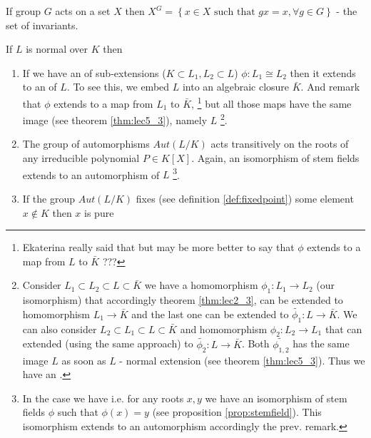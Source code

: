 \begin{definition}
  If group $G$ acts on a set $X$ then $X^G = \left\{x
  \in X \mbox{ such that } gx = x, \forall g \in G\right\}$ - the
  set of invariants.
  \label{def:setinvariants}
\end{definition}

\begin{remark}
  If $L$ is normal over $K$ then
  \begin{enumerate}
  \item If we have an  of sub-extensions
    ($K \subset L_1, L_2 \subset L$)
    $\phi: L_1 \cong L_2$ then it extends to an
     of $L$.  To see this, we embed $L$ into
    an algebraic closure $\bar{K}$. And remark that $\phi$ extends to a
    map from $L_1$ to $\bar{K}$,
    \footnote{
      Ekaterina really said that but may be more better to say that
      $\phi$ extends to a map from $L$ to $\bar{K}$ ???
    }
    but all those maps have the same
    image (see theorem \ref{thm:lec5_3}), namely $L$
    \footnote{
      Consider $L_1 \subset L_2 \subset L \subset \bar{K}$ we have a
      homomorphism $\phi_1: L_1 \to L_2$ (our isomorphism) that
      accordingly theorem \ref{thm:lec2_3}, can be extended to
      homomorphism $L_1 \to \bar{K}$ and the last one can be extended
      to $\tilde{\phi_1}: L \to \bar{K}$. We can also consider
      $L_2 \subset L_1 \subset L \subset \bar{K}$ and homomorphism
      $\phi_2: L_2 \to L_1$ that can extended (using the same
      approach) to  $\tilde{\phi_2}: L \to \bar{K}$. Both
      $\tilde{\phi_{1,2}}$ has the same image $L$ as soon as $L$ -
      normal extension (see theorem \ref{thm:lec5_3}). Thus we have an
      . 
    }.  
  \item The group of automorphisms $Aut\left(L/K\right)$ acts
    transitively on the roots of any irreducible polynomial $P \in
    K\left[X\right]$. Again, an isomorphism of stem fields extends to
    an automorphism of $L$
    \footnote{
      In the case we have  i.e. for any roots
      $x,y$ we have an isomorphism of stem fields $\phi$ such that
      $\phi(x) = y$ (see proposition \ref{prop:stemfield}). This
      isomorphism extends to an automorphism accordingly the
      prev. remark.  
    }.
  \item If the group $Aut\left(L/K\right)$ fixes (see definition
    \label{rem:item:lec5_onnormalext_3}
    \ref{def:fixedpoint}) some element $x \notin K$ then $x$ is pure

\end{enumerate}
\end{remark}
